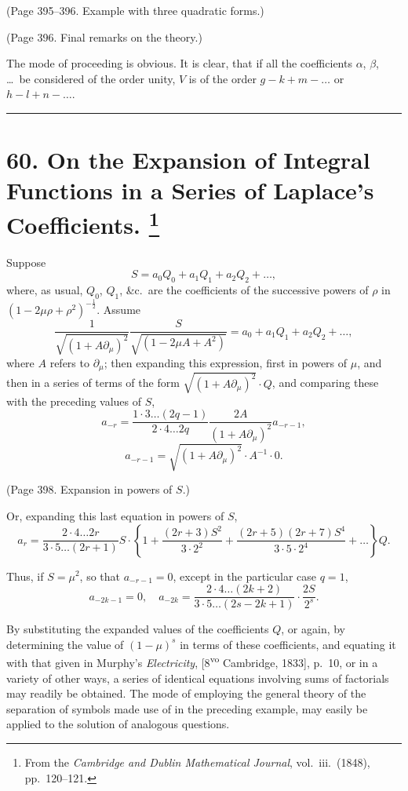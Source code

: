\documentclass[11pt,a4paper]{book}
\begin{document}
(Page 395--396. Example with three quadratic forms.)

(Page 396. Final remarks on the theory.)

The mode of proceeding is obvious. It is clear, that if all the coefficients
$\alpha$, $\beta$, \ldots\ be considered of the order unity, $V$ is of the order
$g - k + m - \ldots$ or $h - l + n - \ldots$.

\bigskip
\hrule
\bigskip

\newpage
\section[On the Expansion of Integral Functions in a Series of Laplace's Coefficients]{%
60. On the Expansion of Integral Functions in a Series of Laplace's Coefficients.%
\footnote{From the \textit{Cambridge and Dublin Mathematical Journal}, vol.~iii.\ (1848), pp.~120--121.}}

Suppose
\[
S = a_0 Q_0 + a_1 Q_1 + a_2 Q_2 + \ldots, \tag{1}
\]
where, as usual, $Q_0$, $Q_1$, \&c.\ are the coefficients of the successive powers of $\rho$ in
$(1 - 2\mu\rho + \rho^2)^{-\frac{1}{2}}$. Assume
\[
\frac{1}{\sqrt{(1 + A\partial_\mu)^2}} \frac{S}{\sqrt{(1 - 2\mu A + A^2)}} = a_0 + a_1 Q_1 + a_2 Q_2 + \ldots, \tag{2}
\]
where $A$ refers to $\partial_\mu$; then expanding this expression, first in powers of $\mu$, and then
in a series of terms of the form $\sqrt{(1 + A\partial_\mu)^2} \cdot Q$, and comparing these with the preceding
values of $S$,
\[
a_{-r} = \frac{1 \cdot 3 \ldots (2q-1)}{2 \cdot 4 \ldots 2q} \frac{2A}{(1+A\partial_\mu)^2} a_{-r-1},
\]
\[
a_{-r-1} = \sqrt{(1 + A\partial_\mu)^2} \cdot A^{-1} \cdot 0. \tag{3}
\]

(Page 398. Expansion in powers of $S$.)

Or, expanding this last equation in powers of $S$,
\[
a_r = \frac{2 \cdot 4 \ldots 2r}{3 \cdot 5 \ldots (2r+1)} S \cdot \left\{
1 + \frac{(2r+3)S^2}{3 \cdot 2^2} + \frac{(2r+5)(2r+7)S^4}{3 \cdot 5 \cdot 2^4} + \ldots
\right\} Q.
\]

Thus, if $S = \mu^2$, so that $a_{-r-1} = 0$, except in the particular case $q = 1$,
\[
a_{-2k-1} = 0, \quad
a_{-2k} = \frac{2 \cdot 4 \ldots (2k+2)}{3 \cdot 5 \ldots (2s-2k+1)} \cdot \frac{2S}{2^s}.
\]

By substituting the expanded values of the coefficients $Q$, or again, by determining
the value of $(1-\mu)^s$ in terms of these coefficients, and equating it with that given in
Murphy's \textit{Electricity}, [8\textsuperscript{vo} Cambridge, 1833], p.~10, or in a variety of other ways,
a series of identical equations involving sums of factorials may readily be obtained.
The mode of employing the general theory of the separation of symbols made use of in
the preceding example, may easily be applied to the solution of analogous questions.
\end{document}
